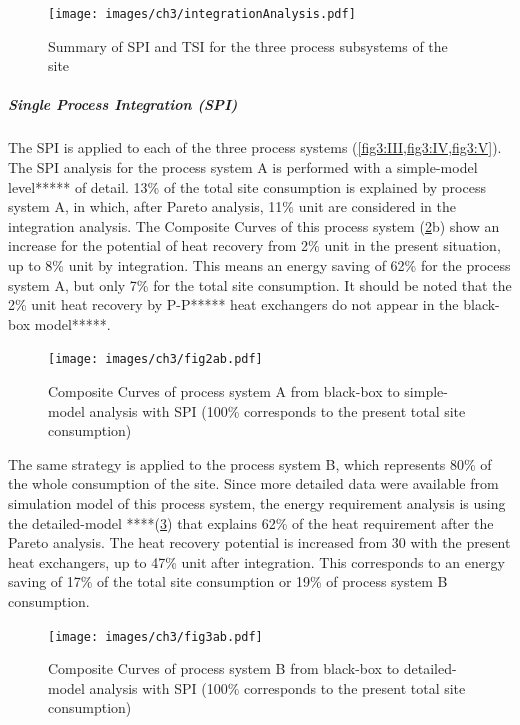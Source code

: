 \begin{figure}[!ht]
\vspace{5mm}
\begin{center}
\texttt{[image: images/ch3/integrationAnalysis.pdf]}
\caption{Summary of SPI and TSI for the three process subsystems of the site}
\label{fig3:new}
\end{center}
\end{figure}

\subparagraph{Single Process Integration (SPI)}

The SPI is applied to each of the three process systems (\cref{fig3:III,fig3:IV,fig3:V}). The SPI analysis for the process system A is performed with a simple-model level***** of detail. 13\% of the total site consumption is explained by process system A, in which, after Pareto analysis, 11\% unit are considered in the integration analysis. The Composite Curves of this process system (\cref{fig3:III}b) show an increase for the potential of heat recovery from 2\% unit in the present situation, up to 8\% unit by integration. This means an energy saving of 62\% for the process system A, but only 7\% for the total site consumption. It should be noted that the 2\% unit heat recovery by P-P***** heat exchangers do not appear in the black-box model*****.

\vspace{10pt}
\begin{figure}[!ht]
\begin{center}
\texttt{[image: images/ch3/fig2ab.pdf]}
\caption{Composite Curves of process system A from black-box to simple-model analysis with SPI (100\% corresponds to the present total site consumption)}
\label{fig3:III}
\end{center}
\end{figure}

The same strategy is applied to the process system B, which represents 80\% of the whole consumption of the site. Since more detailed data were available from simulation model of this process system, the energy requirement analysis is using the detailed-model ****(\cref{fig3:IV}) that explains 62\% of the heat requirement after the Pareto analysis. The heat recovery potential is increased from 30 with the present heat exchangers, up to 47\% unit after integration. This corresponds to an energy saving of 17\% of the total site consumption or 19\% of process system B consumption.

 
\begin{figure}[!ht]
\begin{center}
\texttt{[image: images/ch3/fig3ab.pdf]}
\caption{Composite Curves of process system B from  black-box to detailed-model analysis with SPI (100\% corresponds to the present total site consumption)}
\label{fig3:IV}
\end{center}
\end{figure}

